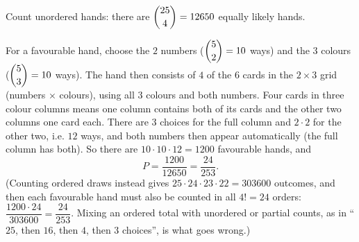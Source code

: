 Count unordered hands: there are $\dbinom{25}{4}=12650$ equally likely hands.

For a favourable hand, choose the $2$ numbers ($\dbinom52=10$ ways) and the $3$ colours ($\dbinom53=10$ ways). The hand then consists of $4$ of the $6$ cards in the $2\times3$ grid (numbers $\times$ colours), using all $3$ colours and both numbers. Four cards in three colour columns means one column contains both of its cards and the other two columns one card each. There are $3$ choices for the full column and $2\cdot2$ for the other two, i.e. $12$ ways, and both numbers then appear automatically (the full column has both). So there are $10\cdot10\cdot12=1200$ favourable hands, and
\[P=\dfrac{1200}{12650}=\boxed{\dfrac{24}{253}}.\]
(Counting ordered draws instead gives $25\cdot24\cdot23\cdot22=303600$ outcomes, and then each favourable hand must also be counted in all $4!=24$ orders: $\dfrac{1200\cdot24}{303600}=\dfrac{24}{253}$. Mixing an ordered total with unordered or partial counts, as in ``$25$, then $16$, then $4$, then $3$ choices'', is what goes wrong.)
